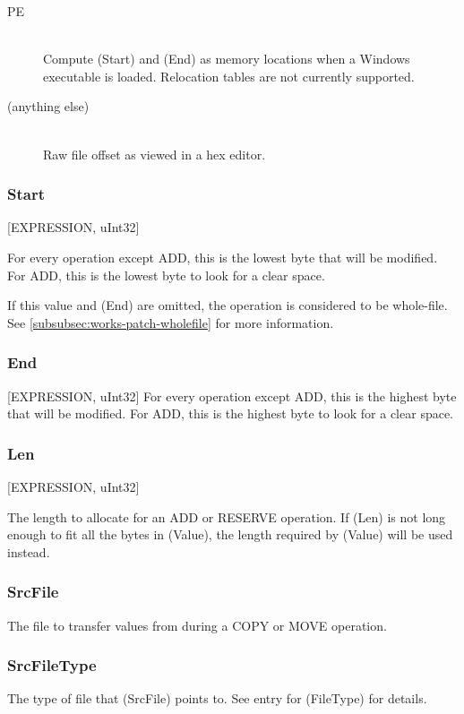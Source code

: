 \documentclass[12pt,a4paper,notitlepage]{article}
\begin{document}
\begin{description}
\item[PE] \hfill \\ 
    Compute (Start) and (End) as memory locations when a Windows executable is loaded. Relocation tables are not currently supported.
\item[(anything else)] \hfill \\
    Raw file offset as viewed in a hex editor.
\end{description}

\subsubsection{Start}
[EXPRESSION, uInt32]

For every operation except ADD, this is the lowest byte that will be modified. For ADD, this is the lowest byte to look for a clear space.

If this value and (End) are omitted, the operation is considered to be whole-file. See \ref{subsubsec:works-patch-wholefile} for more information.

\subsubsection{End}
[EXPRESSION, uInt32]
For every operation except ADD, this is the highest byte that will be modified. For ADD, this is the highest byte to look for a clear space.

\subsubsection{Len}
[EXPRESSION, uInt32]

The length to allocate for an ADD or RESERVE operation. If (Len) is not long enough to fit all the bytes in (Value), the length required by (Value) will be used instead. 

\subsubsection{SrcFile}
The file to transfer values from during a COPY or MOVE operation.

\subsubsection{SrcFileType}
The type of file that (SrcFile) points to. See entry for (FileType) for details.
\end{document}

